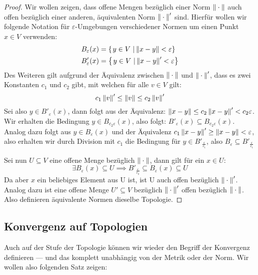 \begin{proof} Wir wollen zeigen, dass offene Mengen bezüglich einer Norm $\left\|\:\cdot\:\right\|$ auch offen bezüglich einer anderen, äquivalenten Norm $\left\|\:\cdot\:\right\|'$ sind. Hierfür wollen wir folgende Notation für $\varepsilon$-Umgebungen verschiedener Normen um einen Punkt $x \in V$ verwenden:
\begin{align*}
    B_\varepsilon(x) &= \left\{\left.y \in V \ \right| \left\|x-y\right\| < \varepsilon \right\}\\
    B'_\varepsilon(x) &= \left\{\left.y \in V \ \right| \left\|x-y\right\|' < \varepsilon \right\}
\end{align*}
Des Weiteren gilt aufgrund der Äquivalenz zwischen $\left\|\:\cdot\:\right\|$ und $\left\|\:\cdot\:\right\|'$, dass es zwei Konstanten $c_1$ und $c_2$ gibt, mit welchen für alle $v \in V$ gilt:
$$c_1 \left\|v\right\|' \leq \left\|v\right\| \leq c_2 \left\|v\right\|'$$
Sei also $y \in B'_\varepsilon(x)$, dann folgt aus der Äquivalenz: $\left\|x-y\right\| \leq c_2\left\|x-y\right\|' < c_2 \varepsilon$. Wir erhalten die Bedingung $y \in B_{c_2 \varepsilon}(x)$, also folgt: $B'_\varepsilon(x) \subseteq B_{c_2 \varepsilon}(x)$. Analog dazu folgt aus $y \in B_\varepsilon(x)$ und der Äquivalenz $c_1\left\|x-y\right\|' \geq \left\|x-y\right\| < \varepsilon$, also erhalten wir durch Division mit $c_1$ die Bedingung für $y \in B'_{\frac{\varepsilon}{c_1}}$, also $B_\varepsilon \subseteq B'_{\frac{\varepsilon}{c_1}}$

Sei nun $U\subseteq V$ eine offene Menge bezüglich $\left\|\:\cdot\:\right\|$, dann gilt für ein $x \in U$:
$$\exists B_\varepsilon(x) \subseteq U \implies B'_{\frac{\varepsilon}{c_2}} \subseteq B_\varepsilon(x) \subseteq U$$
Da aber $x$ ein beliebiges Element aus U ist, ist U auch offen bezüglich $\left\|\:\cdot\:\right\|'$. Analog dazu ist eine offene Menge $U'\subseteq V$ bezüglich $\left\|\:\cdot\:\right\|'$ offen bezüglich $\left\|\:\cdot\:\right\|$. Also definieren äquivalente Normen dieselbe Topologie.
\end{proof}

\subsection{Konvergenz auf Topologien}
Auch auf der Stufe der Topologie können wir wieder den Begriff der Konvergenz definieren --- und das komplett unabhängig von der Metrik oder der Norm. Wir wollen also folgenden Satz zeigen:

